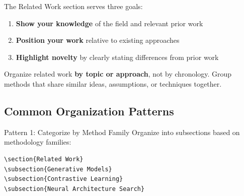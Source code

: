 \documentclass[]{fairmeta} %
\theoremstyle{plain}
\theoremstyle{definition}
\theoremstyle{remark}
\begin{document}
The Related Work section serves three goals:

\begin{enumerate}
    \item \textbf{Show your knowledge} of the field and relevant prior work
    \item \textbf{Position your work} relative to existing approaches
    \item \textbf{Highlight novelty} by clearly stating differences from prior work
\end{enumerate}

Organize related work \textbf{by topic or approach}, not by chronology. Group methods that share similar ideas, assumptions, or techniques together.


\subsection{Common Organization Patterns}
\label{sec:rw-patterns}

\begin{AIbox}{Pattern 1: Categorize by Method Family}
Organize into subsections based on methodology families:

\begin{verbatim}
\section{Related Work}
\subsection{Generative Models}
\subsection{Contrastive Learning}
\subsection{Neural Architecture Search}
\end{verbatim}
\end{AIbox}
\end{document}
